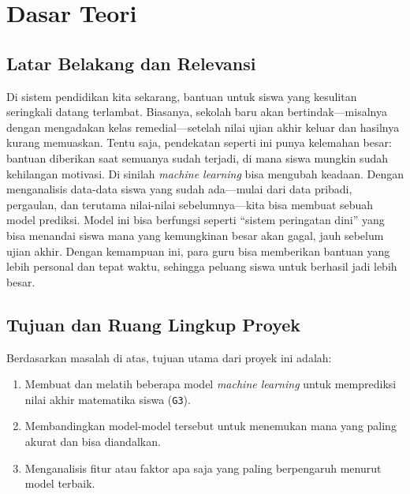 \chapter*{Dasar Teori}

\section{Latar Belakang dan Relevansi}
Di sistem pendidikan kita sekarang, bantuan untuk siswa yang kesulitan seringkali datang terlambat. Biasanya, sekolah baru akan bertindak---misalnya dengan mengadakan kelas remedial---setelah nilai ujian akhir keluar dan hasilnya kurang memuaskan. Tentu saja, pendekatan seperti ini punya kelemahan besar: bantuan diberikan saat semuanya sudah terjadi, di mana siswa mungkin sudah kehilangan motivasi.
Di sinilah \textit{machine learning} bisa mengubah keadaan. Dengan menganalisis data-data siswa yang sudah ada---mulai dari data pribadi, pergaulan, dan terutama nilai-nilai sebelumnya---kita bisa membuat sebuah model prediksi. Model ini bisa berfungsi seperti ``sistem peringatan dini'' yang bisa menandai siswa mana yang kemungkinan besar akan gagal, jauh sebelum ujian akhir. Dengan kemampuan ini, para guru bisa memberikan bantuan yang lebih personal dan tepat waktu, sehingga peluang siswa untuk berhasil jadi lebih besar.

\section{Tujuan dan Ruang Lingkup Proyek}
Berdasarkan masalah di atas, tujuan utama dari proyek ini adalah:
\begin{enumerate}
    \item Membuat dan melatih beberapa model \textit{machine learning} untuk memprediksi nilai akhir matematika siswa (\texttt{G3}).
    \item Membandingkan model-model tersebut untuk menemukan mana yang paling akurat dan bisa diandalkan.
    \item Menganalisis fitur atau faktor apa saja yang paling berpengaruh menurut model terbaik.
\end{enumerate}

